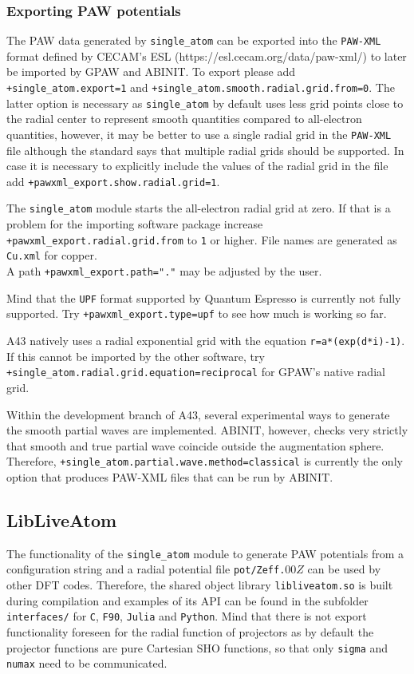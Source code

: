 \documentclass[oribibl]{llncs}
\newcommand{\ttt}[1]{\texttt{#1}}
\newcommand{\codename}{A43}
\begin{document}
\subsubsection{Exporting PAW potentials} \label{sec:single-atom-export}
%
The \ac{PAW} data generated by \ttt{single\_atom} can be exported into the \ttt{PAW-XML} format defined
by CECAM's ESL\cite{CECAM_Electronic_Structure_Library} (https://esl.cecam.org/data/paw-xml/)
to later be imported by GPAW\cite{gpaw} and ABINIT\cite{abinit}.
To export please add \ttt{+single\_atom.export=1} and \ttt{+single\_atom.smooth.radial.grid.from=0}.
The latter option is necessary as \ttt{single\_atom} by default uses less grid points close to the radial center 
to represent smooth quantities compared to all-electron quantities, 
however, it may be better to use a single radial grid in the \ttt{PAW-XML} file
although the standard says that multiple radial grids should be supported.
In case it is necessary to explicitly include the values of the radial grid in the file add 
\ttt{+pawxml\_export.show.radial.grid=1}.

\noindent
The \ttt{single\_atom} module starts the all-electron radial grid at zero.
If that is a problem for the importing software package increase \ttt{+pawxml\_export.radial.grid.from} to \ttt{1} or higher. File names are generated as \ttt{Cu.xml} for copper. \\
A path \ttt{+pawxml\_export.path="."} may be adjusted by the user. 

\noindent
Mind that the \ttt{UPF} format supported by Quantum Espresso\cite{qe} is currently not fully supported.
Try \ttt{+pawxml\_export.type=upf} to see how much is working so far.

\noindent
\codename{} natively uses a radial exponential grid with the equation \ttt{r=a*(exp(d*i)-1)}.
If this cannot be imported by the other software, try \ttt{+single\_atom.radial.grid.equation=reciprocal} for GPAW's native radial grid.

\noindent
Within the development branch of \codename{}, several experimental ways to generate the smooth partial waves
are implemented. ABINIT, however, checks very strictly that smooth and true partial wave coincide outside the augmentation sphere. Therefore, \ttt{+single\_atom.partial.wave.method=classical} is currently the only option that produces PAW-XML files that can be run by ABINIT.


\subsection{LibLiveAtom} \label{sec:lib-live-atom}
%
The functionality of the \ttt{single\_atom} module to generate \ac{PAW} potentials from a configuration string and a radial potential file \ttt{pot/Zeff.}$00Z$ can be used by other \ac{DFT} codes.
Therefore, the shared object library \ttt{libliveatom.so} is built during compilation and examples of its \ac{API} can be found in the subfolder \ttt{interfaces/} for \ttt{C}, \ttt{F90}, \ttt{Julia} and \ttt{Python}.
Mind that there is not export functionality foreseen for the radial function of projectors as by default the projector functions are pure Cartesian \ac{SHO} functions, so that only \ttt{sigma} and \ttt{numax} need to be communicated.
\end{document}
